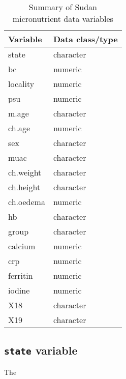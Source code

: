 \documentclass[12pt,a4paper]{article}
\begin{document}
\begin{table}

\caption{\label{tab:varTab}Summary of Sudan micronutrient data variables}
\centering
\begin{tabular}[t]{ll}
\toprule
Variable & Data class/type\\
\midrule
state & character\\
bc & numeric\\
locality & numeric\\
psu & numeric\\
m.age & character\\
\addlinespace
ch.age & numeric\\
sex & character\\
muac & character\\
ch.weight & character\\
ch.height & character\\
\addlinespace
ch.oedema & numeric\\
hb & character\\
group & character\\
calcium & numeric\\
crp & numeric\\
\addlinespace
ferritin & numeric\\
iodine & numeric\\
X18 & character\\
X19 & character\\
\bottomrule
\end{tabular}
\end{table}

\hypertarget{state-variable}{%
\subsection{\texorpdfstring{\texttt{state} variable}{state variable}}\label{state-variable}}

The


\end{document}
